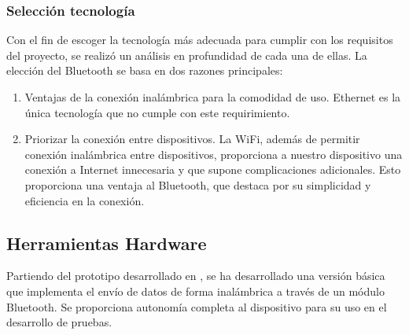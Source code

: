 \subsubsection{Selección tecnología}
Con el fin de escoger la tecnología más adecuada para cumplir con los requisitos del proyecto, se realizó un análisis en profundidad de cada una de ellas. La elección del Bluetooth se basa en dos razones principales:
\begin{enumerate}
    \item Ventajas de la conexión inalámbrica para la comodidad de uso. Ethernet es la única tecnología que no cumple con este requirimiento.
    \item Priorizar la conexión entre dispositivos. La WiFi, además de permitir conexión inalámbrica entre dispositivos, proporciona a nuestro dispositivo una conexión a Internet innecesaria y que supone complicaciones adicionales. Esto proporciona una ventaja al Bluetooth, que destaca por su simplicidad y eficiencia en la conexión.
\end{enumerate}

\subsection{Herramientas Hardware}
Partiendo del prototipo desarrollado en \cite{saragonz91:online}, se ha desarrollado una versión básica que implementa el envío de datos de forma inalámbrica a través de un módulo Bluetooth. Se proporciona autonomía completa al dispositivo para su uso en el desarrollo de pruebas.

